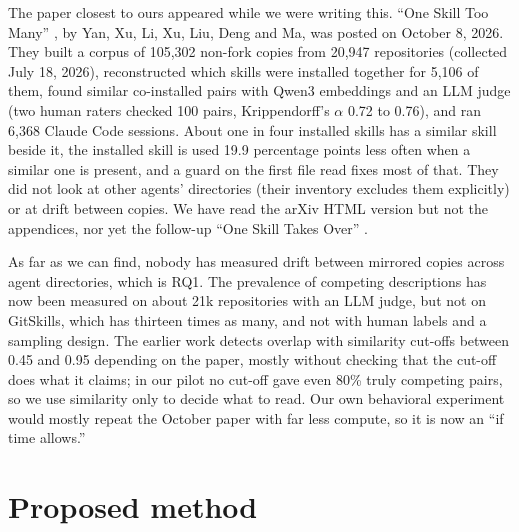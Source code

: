 \documentclass[11pt]{article}
\begin{document}
The paper closest to ours appeared while we were writing this. ``One Skill Too Many'' \cite{oneskilltoomany2026}, by Yan, Xu,
Li, Xu, Liu, Deng and Ma, was posted on October 8, 2026. They built a corpus of 105{,}302 non-fork copies from 20{,}947
repositories (collected July 18, 2026), reconstructed which skills were installed together for 5{,}106 of them, found similar
co-installed pairs with Qwen3 embeddings and an LLM judge (two human raters checked 100 pairs, Krippendorff's $\alpha$ 0.72
to 0.76), and ran 6{,}368 Claude Code sessions. About one in four installed skills has a similar skill beside it, the
installed skill is used 19.9 percentage points less often when a similar one is present, and a guard on the first file read
fixes most of that. They did not look at other agents' directories (their inventory excludes them explicitly) or at drift
between copies. We have read the arXiv HTML version but not the appendices, nor yet the follow-up ``One Skill Takes Over''
\cite{oneskilltakesover2026}.

As far as we can find, nobody has measured drift between mirrored copies across agent directories, which is RQ1. The
prevalence of competing descriptions has now been measured on about 21k repositories with an LLM judge, but not on GitSkills,
which has thirteen times as many, and not with human labels and a sampling design. The earlier work detects overlap with
similarity cut-offs between 0.45 and 0.95 depending on the paper, mostly without checking that the cut-off does what it
claims; in our pilot no cut-off gave even 80\% truly competing pairs, so we use similarity only to decide what to read. Our
own behavioral experiment would mostly repeat the October paper with far less compute, so it is now an ``if time allows.''

\section{Proposed method}
\end{document}
